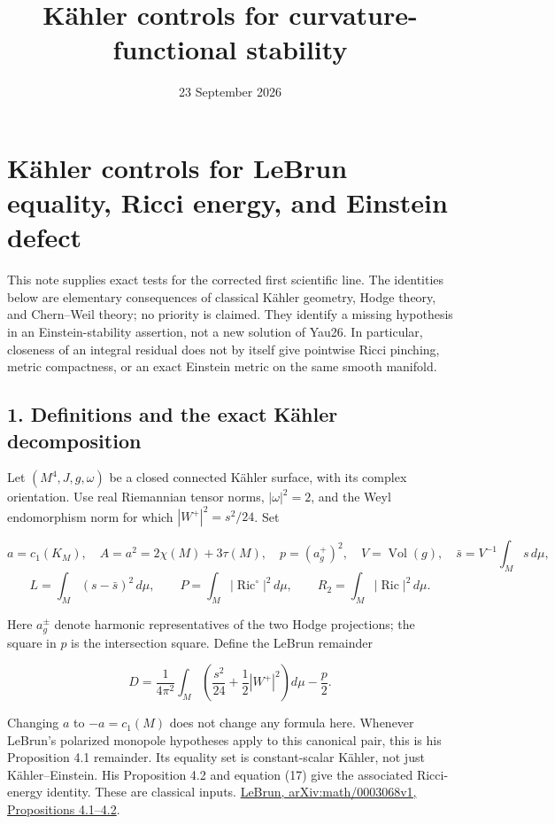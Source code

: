 \documentclass[
  11pt,
]{article}
\title{Kähler controls for curvature-functional stability}
\author{}
\date{23 September 2026}
\begin{document}
\maketitle

\hypertarget{kuxe4hler-controls-for-lebrun-equality-ricci-energy-and-einstein-defect}{%
\section{Kähler controls for LeBrun equality, Ricci energy, and Einstein
defect}\label{kuxe4hler-controls-for-lebrun-equality-ricci-energy-and-einstein-defect}}

This note supplies exact tests for the corrected first scientific line.
The identities below are elementary consequences of classical Kähler
geometry, Hodge theory, and Chern--Weil theory; no priority is claimed.
They identify a missing hypothesis in an Einstein-stability assertion,
not a new solution of Yau26. In particular, closeness of an integral
residual does not by itself give pointwise Ricci pinching, metric
compactness, or an exact Einstein metric on the same smooth manifold.

\hypertarget{definitions-and-the-exact-kuxe4hler-decomposition}{%
\subsection{1. Definitions and the exact Kähler
decomposition}\label{definitions-and-the-exact-kuxe4hler-decomposition}}

Let \((M^4,J,g,\omega)\) be a closed connected Kähler surface, with its
complex orientation. Use real Riemannian tensor norms, \(|\omega|^2=2\),
and the Weyl endomorphism norm for which \(|W^+|^2=s^2/24\). Set

\[
 a=c_1(K_M),\quad A=a^2=2\chi(M)+3\tau(M),\quad
 p=(a_g^+)^2,\quad V=\operatorname{Vol}(g),\quad
 \bar s=V^{-1}\int_M s\,d\mu,
\] \[
 L=\int_M(s-\bar s)^2\,d\mu,\qquad
 P=\int_M|\operatorname{Ric}^{\circ}|^2\,d\mu,\qquad
 R_2=\int_M|\operatorname{Ric}|^2\,d\mu.
\]

Here \(a_g^\pm\) denote harmonic representatives of the two Hodge
projections; the square in \(p\) is the intersection square. Define the
LeBrun remainder

\[
 D=\frac1{4\pi^2}\int_M
       \left(\frac{s^2}{24}+\frac12|W^+|^2\right)d\mu-\frac p2.
 \tag{1}
\]

Changing \(a\) to \(-a=c_1(M)\) does not change any formula here.
Whenever LeBrun's polarized monopole hypotheses apply to this canonical
pair, this is his Proposition 4.1 remainder. Its equality set is
constant-scalar Kähler, not just Kähler--Einstein. His Proposition 4.2
and equation (17) give the associated Ricci-energy identity. These are
classical inputs. \href{https://arxiv.org/pdf/math/0003068}{LeBrun,
arXiv:math/0003068v1, Propositions 4.1--4.2}.
\end{document}
